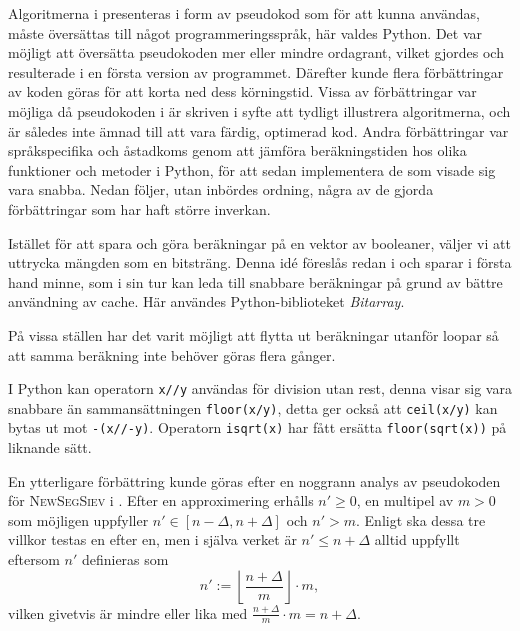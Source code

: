 
Algoritmerna i \cite{HaraldSieve} presenteras i form av pseudokod som för att kunna användas, måste översättas till något programmeringsspråk, här valdes Python.
Det var möjligt att översätta pseudokoden mer eller mindre ordagrant, vilket gjordes och resulterade i en första version av programmet.
Därefter kunde flera förbättringar av koden göras för att korta ned dess körningstid. 
Vissa av förbättringar var möjliga då pseudokoden i \cite{HaraldSieve} är skriven i syfte att tydligt illustrera algoritmerna,
och är således inte ämnad till att vara färdig, optimerad kod.
Andra förbättringar var språkspecifika och åstadkoms genom att jämföra beräkningstiden hos olika funktioner och metoder i Python, för att sedan implementera de som visade sig vara snabba. Nedan följer, utan inbördes ordning, några av de gjorda förbättringar som har haft större inverkan.
\begin{myitemize}
    \item
    Istället för att spara och göra beräkningar på en vektor av booleaner, väljer vi att uttrycka mängden som en bitsträng. 
    Denna idé föreslås redan i \cite{HaraldSieve} och sparar i första hand minne,
    som i sin tur kan leda till snabbare beräkningar på grund av bättre användning av cache.
    Här användes Python-biblioteket \textit{Bitarray}.
    \item
    På vissa ställen har det varit möjligt att flytta ut beräkningar utanför loopar så att samma beräkning inte behöver göras flera gånger.
    \item
    I Python kan operatorn \texttt{x//y} användas för division utan rest, denna visar sig vara snabbare än sammansättningen \texttt{floor(x/y)},
    detta ger också att \texttt{ceil(x/y)} kan bytas ut mot \texttt{-(x//-y)}. Operatorn \texttt{isqrt(x)} har fått ersätta \texttt{floor(sqrt(x))} på liknande sätt.
\end{myitemize}
En ytterligare förbättring kunde göras efter en noggrann analys av pseudokoden för \textsc{NewSegSiev} i \cite[s.338]{HaraldSieve}.
Efter en approximering erhålls $n'\geq0$, en multipel av $m>0$ som möjligen uppfyller $n'\in[n-\Delta,n+\Delta]$ och $n'>m$.
Enligt \cite{HaraldSieve} ska dessa tre villkor testas en efter en,
men i själva verket är $n'\leq n+\Delta$ alltid uppfyllt eftersom $n'$ definieras som
\begin{equation} \label{helf.nprim}
    n' := \left\lfloor \frac{n+\Delta}{m} \right\rfloor\cdot m,
\end{equation}
vilken givetvis är mindre eller lika med $\frac{n+\Delta}{m}\cdot m = n+\Delta$. 
